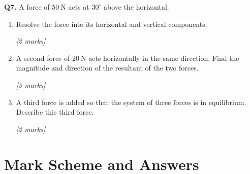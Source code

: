 \begin{tcolorbox}[colback=white, colframe=midblue, breakable]
\begin{minipage}{\linewidth}
\textbf{Q7.} A force of $50\ \text{N}$ acts at $30^\circ$ above the horizontal.

\begin{enumerate}[label=(\alph*)]
  \item Resolve the force into its horizontal and vertical components.
  \par\hfill\textit{[2 marks]}
  \vspace{3cm}

  \item A second force of $20\ \text{N}$ acts horizontally in the same direction. Find the magnitude and direction of the resultant of the two forces.
  \par\hfill\textit{[3 marks]}
  \vspace{4cm}

  \item A third force is added so that the system of three forces is in equilibrium. Describe this third force.
  \par\hfill\textit{[2 marks]}
  \vspace{3cm}
\end{enumerate}
\end{minipage}

\end{tcolorbox}

\pagebreak

\section{Mark Scheme and Answers}

